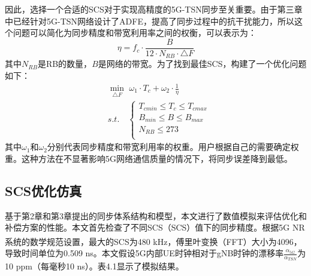 \documentclass[UTF8,a4paper,12pt]{ctexart}
\numberwithin{equation}{section}
\begin{document}
因此，选择一个合适的SCS对于实现高精度的5G-TSN同步至关重要。由于第三章中已经针对5G-TSN网络设计了ADFE，提高了同步过程中的抗干扰能力，所以这个问题可以简化为同步精度和带宽利用率之间的权衡，可以表示为：
\begin{equation}
	\eta=f_c\cdot \frac{B}{12\cdot N_{RB}\cdot \triangle F}
\end{equation}
其中$N_{RB}$是RB的数量，$B$是网络的带宽。为了找到最佳SCS，构建了一个优化问题如下：
\begin{equation}
	\begin{split}
		&\min_{\triangle F} \,\, \omega_1 \cdot T_c+\omega_2 \cdot \frac{1}{\eta} \\
		&s.t.\quad  \left\{\begin{array}{lc}
			T_{cmin}\leq T_c \leq T_{cmax}\\
			B_{min}\leq B \leq B_{max}\\
			N_{RB}\leq 273\\
		\end{array}\right.
	\end{split}
\end{equation}
其中$\omega_1$和$\omega_2$分别代表同步精度和带宽利用率的权重。用户根据自己的需要确定权重。这种方法在不显著影响5G网络通信质量的情况下，将同步误差降到最低。
\begin{figure}[htb] 
\end{figure}

\subsection{SCS优化仿真}
基于第2章和第3章提出的同步体系结构和模型，本文进行了数值模拟来评估优化和补偿方案的性能。本文首先检查了不同SCS（SCS）值下的同步精度。根据5G NR系统的数学规范设置\textsuperscript{\cite{access2015requirements}}，最大的SCS为480 kHz，傅里叶变换（FFT）大小为4096，导致时间单位为0.509 ns。本文假设5G内部UE时钟相对于gNB时钟的漂移率$\frac{\alpha_{5G}}{\alpha_{TSN}}$为10 ppm（每毫秒10 ns）。表4.1显示了模拟结果。
\end{document}
